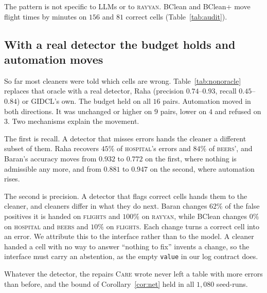 \documentclass[sigconf, nonacm, balance=false]{acmart}
\theoremstyle{remark}
\begin{document}
The pattern is not specific to LLMs or to \textsc{rayyan}. BClean and BClean+ move
flight times by minutes on $156$ and $81$ correct cells (Table~\ref{tab:audit}).

\subsection{With a real detector the budget holds and automation moves}
\label{sec:nonoracle}

\begin{table}[t]
  \centering
  \caption{Oracle versus real detection at $\alpha=0.2$, as the share of repairs
  written and their error, with the real detector's precision and recall. The real
  detector is Raha, or GIDCL's own ($\S$). Bold marks the pairs whose share did not
  fall, and $\ddagger$ logs that also list the cells a cleaner left unchanged. Baran is
  one draw.}
  \label{tab:nonoracle}
  
\end{table}

So far most cleaners were told which cells are wrong. Table~\ref{tab:nonoracle}
replaces that oracle with a real detector, Raha (precision $0.74$--$0.93$, recall
$0.45$--$0.84$) or GIDCL's own. The budget held on all $16$ pairs. Automation moved in
both directions. It was unchanged or higher on $9$ pairs, lower on $4$ and refused on
$3$. Two mechanisms explain the movement.

The first is recall. A detector that misses errors hands the cleaner a different
subset of them. Raha recovers $45\%$ of \textsc{hospital}'s errors and $84\%$ of
\textsc{beers}', and Baran's accuracy moves from $0.932$ to $0.772$ on the first, where
nothing is admissible any more, and from $0.881$ to $0.947$ on the second, where
automation rises.

The second is precision. A detector that flags correct cells hands them to the cleaner,
and cleaners differ in what they do next. Baran changes $62\%$ of the false positives it
is handed on \textsc{flights} and $100\%$ on \textsc{rayyan}, while BClean changes $0\%$
on \textsc{hospital} and \textsc{beers} and $10\%$ on \textsc{flights}. Each change
turns a correct cell into an error. We attribute this to the interface rather than to
the model. A cleaner handed a cell with no way to answer ``nothing to fix'' invents a
change, so the interface must carry an abstention, as the empty \texttt{value} in our
log contract does.

Whatever the detector, the repairs \textsc{Care} wrote never left a table with more
errors than before, and the bound of Corollary~\ref{cor:net} held in all $1{,}080$
seed-runs.
\end{document}
